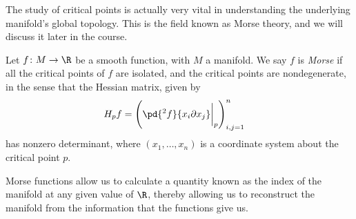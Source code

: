 \documentclass[10pt]{mypackage}
\begin{document}
The study of critical points is actually very vital in understanding the underlying manifold's global topology. This is the field known as Morse theory, and we will discuss it later in the course.
\begin{definition}
  Let $f\colon M\rightarrow \R$ be a smooth function, with $M$ a manifold. We say $f$ is \textit{Morse} if all the critical points of $f$ are isolated, and the critical points are nondegenerate, in the sense that the Hessian matrix, given by
  \begin{align*}
    H_pf &= \left( \pd{^2f}{x_i\partial x_j}\biggr\vert_{p} \right)_{i,j=1}^{n}
  \end{align*}
  has nonzero determinant, where $\left( x_1,\dots,x_n \right)$ is a coordinate system about the critical point $p$.
\end{definition}
Morse functions allow us to calculate a quantity known as the index of the manifold at any given value of $\R$, thereby allowing us to reconstruct the manifold from the information that the functions give us.\newline
\end{document}
